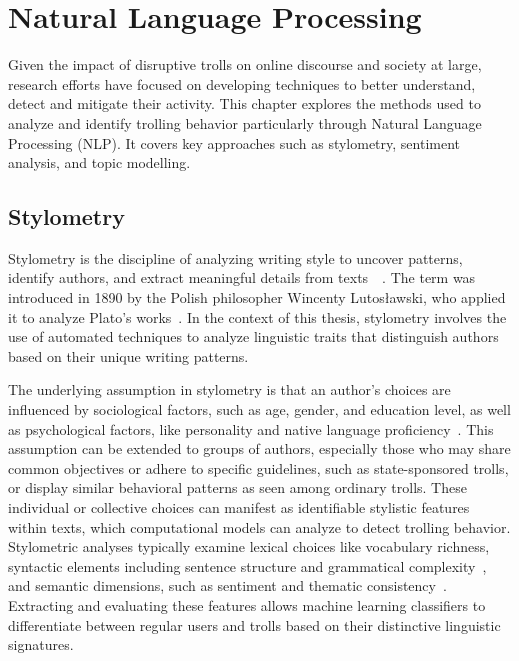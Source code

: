 \documentclass[twoside]{ctuthesis}
\theoremstyle{plain}
\theoremstyle{definition}
\theoremstyle{note}
\begin{document}
\chapter{Natural Language Processing}
Given the impact of disruptive trolls on online discourse and society at large, research efforts have focused on developing techniques to better understand, detect and mitigate their activity. This chapter explores the methods used to analyze and identify trolling behavior particularly through Natural Language Processing (NLP). It covers key approaches such as stylometry, sentiment analysis, and topic modelling.\par

\section{Stylometry}
Stylometry is the discipline of analyzing writing style to uncover patterns, identify authors, and extract meaningful details from texts~\cite{Mosteller1964Federalist}~\cite{Pascucci2020Misogyny}. The term was introduced in 1890 by the Polish philosopher Wincenty Lutosławski, who applied it to analyze Plato's works~\cite{Lutoslawski1898}. In the context of this thesis,  stylometry involves the use of automated techniques to analyze linguistic traits that distinguish authors based on their unique writing patterns.\par
The underlying assumption in stylometry is that an author's choices are influenced by sociological factors, such as age, gender, and education level, as well as psychological factors, like personality and native language proficiency~\cite{Daelemans2013Explanation}. This assumption can be extended to groups of authors, especially those who may share common objectives or adhere to specific guidelines, such as state-sponsored trolls, or display similar behavioral patterns as seen among ordinary trolls. These individual or collective choices can manifest as identifiable stylistic features within texts, which computational models can analyze to detect trolling behavior.
Stylometric analyses typically examine lexical choices like vocabulary richness, syntactic elements including sentence structure and grammatical complexity~\cite{Sari2018Features}, and semantic dimensions, such as sentiment and thematic consistency~\cite{PerezRosas2018Stylometry}. Extracting and evaluating these features allows machine learning classifiers to differentiate between regular users and trolls based on their distinctive linguistic signatures.\par
\end{document}
